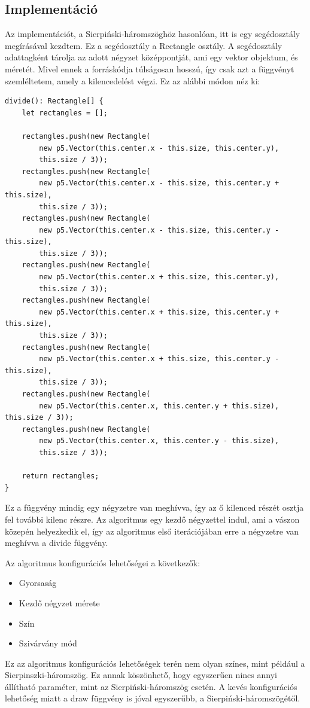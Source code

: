 \subsection*{Implementáció}
Az implementációt, a Sierpiński-háromszöghöz hasonlóan, itt is egy segédosztály megírásával kezdtem. Ez a segédosztály a Rectangle osztály. A segédosztály adattagként tárolja az adott négyzet középpontját, ami egy vektor objektum, és méretét. Mivel ennek a forráskódja túlságosan hosszú, így csak azt a függvényt szemléltetem, amely a kilencedelést végzi. Ez az alábbi módon néz ki:
\begin{lstlisting}
divide(): Rectangle[] {
	let rectangles = [];
	
	rectangles.push(new Rectangle(
		new p5.Vector(this.center.x - this.size, this.center.y), 
		this.size / 3));
	rectangles.push(new Rectangle(
		new p5.Vector(this.center.x - this.size, this.center.y + this.size), 
		this.size / 3));
	rectangles.push(new Rectangle(
		new p5.Vector(this.center.x - this.size, this.center.y - this.size), 
		this.size / 3));
	rectangles.push(new Rectangle(
		new p5.Vector(this.center.x + this.size, this.center.y), 
		this.size / 3));
	rectangles.push(new Rectangle(
		new p5.Vector(this.center.x + this.size, this.center.y + this.size), 
		this.size / 3));
	rectangles.push(new Rectangle(
		new p5.Vector(this.center.x + this.size, this.center.y - this.size), 
		this.size / 3));
	rectangles.push(new Rectangle(
		new p5.Vector(this.center.x, this.center.y + this.size), this.size / 3));
	rectangles.push(new Rectangle(
		new p5.Vector(this.center.x, this.center.y - this.size), 
		this.size / 3));
	
	return rectangles;
}
\end{lstlisting}
Ez a függvény mindig egy négyzetre van meghívva, így az ő kilenced részét osztja fel további kilenc részre. Az algoritmus egy kezdő négyzettel indul, ami a vászon közepén helyezkedik el, így az algoritmus első iterációjában erre a négyzetre van meghívva a divide függvény. 
\par Az algoritmus konfigurációs lehetőségei a következők:
\begin{itemize}
	\item Gyorsaság
	\item Kezdő négyzet mérete
	\item Szín 
	\item Szivárvány mód
\end{itemize}
Ez az algoritmus konfigurációs lehetőségek terén nem olyan színes, mint például a Sierpinszki-háromszög. Ez annak köszönhető, hogy egyszerűen nincs annyi állítható paraméter, mint az Sierpiński-háromszög esetén. A kevés konfigurációs lehetőség miatt a draw függvény is jóval egyszerűbb, a Sierpiński-háromszögétől.
